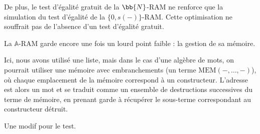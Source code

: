 \documentclass{report}
\newcommand{\bbA}{\mathbb{A}}
\begin{document}
				De plus, le test d'égalité gratuit de la $\bb{N}$-RAM ne renforce que la simulation du test d'égalité de la $\{0,s(-)\}$-RAM. Cette optimisation ne souffrait pas de l'absence d'un test d'égalité gratuit. 
				
				La $\bbA$-RAM garde encore une fois un lourd point faible : la gestion de sa mémoire.
				
				Ici, nous avons utilisé une liste, mais dans le cas d'une algèbre de mots, on pourrait utiliser une mémoire avec embranchements (un terme $\text{MEM}\left( -, \dots, -\right)$), où chaque emplacement de la mémoire correspond à un constructeur. L'adresse est alors un mot et se traduit comme un ensemble de destructions successives du terme de mémoire, en prenant garde à récupérer le sous-terme correspondant au constructeur détruit.
				
				
				Une modif pour le test.
				
			
			
			
			
			
			
			
			
			
			
			
			
			
			
			
			
			
			
\end{document}
